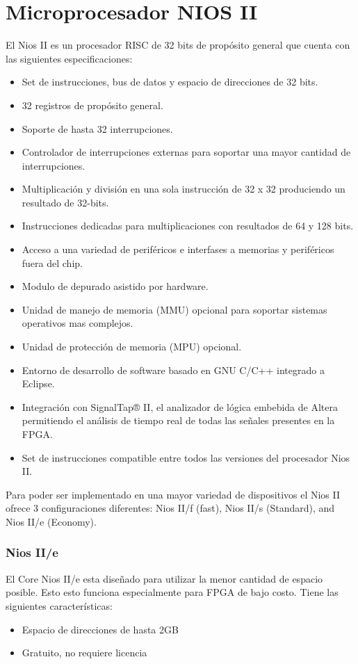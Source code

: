 \section{Microprocesador NIOS II}
El Nios II es un procesador RISC de 32 bits de propósito general que cuenta con las siguientes especificaciones:
\begin{itemize}
	\item Set de instrucciones, bus de datos y espacio de direcciones de 32 bits.
	\item 32 registros de propósito general.
	\item Soporte de hasta 32 interrupciones.
	\item Controlador de interrupciones externas para soportar una mayor cantidad de interrupciones.
	\item Multiplicación y división en una sola instrucción de 32 x 32 produciendo un resultado de 32-bits.
	\item Instrucciones dedicadas para multiplicaciones con resultados de 64 y 128 bits.
	\item Acceso a una variedad de periféricos e interfases a memorias  y periféricos fuera del chip.
	\item Modulo de depurado asistido por hardware.
	\item Unidad de manejo de memoria (MMU) opcional para soportar sistemas operativos mas complejos.
	\item Unidad de protección de memoria (MPU) opcional.
	\item Entorno de desarrollo de software basado en GNU C/C++ integrado a Eclipse.
	\item Integración con SignalTap® II, el analizador de lógica embebida de Altera permitiendo el análisis de tiempo real de todas las señales presentes en la FPGA.
	\item Set de instrucciones compatible entre todos las versiones del procesador Nios II.
\end{itemize}

Para poder ser implementado en una mayor variedad de dispositivos el Nios II ofrece 3 configuraciones diferentes:  Nios II/f (fast), Nios II/s (Standard), and Nios II/e (Economy).

\subsubsection{Nios II/e}
El Core Nios II/e esta diseñado para utilizar la menor cantidad de espacio posible. Esto esto funciona especialmente para FPGA de bajo costo. Tiene las siguientes características:
\begin{itemize}
	\item Espacio de direcciones de hasta 2GB
	\item Gratuito, no requiere licencia 
\end{itemize}

